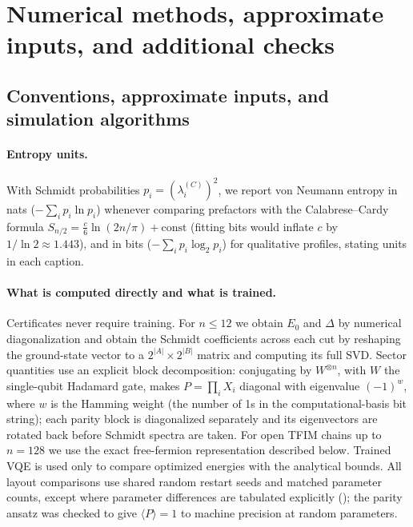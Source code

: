\documentclass[reprint,aps,pra,floatfix,superscriptaddress,nofootinbib,longbibliography]{revtex4-2}
\theoremstyle{remark}
\theoremstyle{definition}
\begin{document}
\section{Numerical methods, approximate inputs, and additional checks}
\label{app:numerics}

\subsection{Conventions, approximate inputs, and simulation algorithms}

\paragraph{Entropy units.}
With Schmidt probabilities $p_i=(\lambda_i^{(C)})^2$, we report von Neumann
entropy in nats ($-\sum_i p_i\ln p_i$) whenever comparing prefactors with the
Calabrese--Cardy formula $S_{n/2}=\tfrac{c}{6}\ln(2n/\pi)+\mathrm{const}$ (fitting
bits would inflate $c$ by $1/\ln2\approx1.443$), and in bits ($-\sum_i p_i\log_2 p_i$)
for qualitative profiles, stating units in each caption.

\paragraph{What is computed directly and what is trained.}
Certificates never require training. For $n\le12$ we obtain $E_0$ and $\Delta$
by numerical diagonalization and obtain the Schmidt coefficients across each cut
by reshaping the ground-state vector to a $2^{|A|}\times2^{|B|}$ matrix and
computing its full SVD. Sector quantities use an
explicit block decomposition: conjugating by $W^{\otimes n}$, with $W$ the
single-qubit Hadamard gate, makes $P=\prod_iX_i$ diagonal with eigenvalue
$(-1)^{w}$, where $w$ is the Hamming weight (the number of 1s in the
computational-basis bit string); each parity block is diagonalized separately and
its eigenvectors are rotated back before Schmidt spectra are taken. For open TFIM
chains up to $n=128$ we use the exact free-fermion representation described
below. Trained VQE is used only to compare optimized energies with the analytical
bounds. All layout comparisons use shared random restart seeds and matched
parameter counts, except where parameter differences are tabulated explicitly
(); the parity ansatz was checked to give $\langle P\rangle=1$
to machine precision at random parameters.
\end{document}
